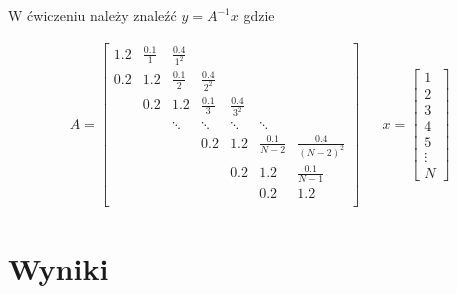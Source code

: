 \documentclass[11pt]{extarticle}
\begin{document}
	\subsection{}
	W ćwiczeniu należy znaleźć \(y = A^{-1}x\) gdzie

	\begin{align}
		A = \begin{bmatrix}
							  1.2		& \frac{0.1}{1}		& \frac{0.4}{1^2} 		\\[6pt]
					0.2		& 1.2		& \frac{0.1}{2}		& \frac{0.4}{2^2} 		\\[6pt]
			&		0.2		& 1.2		& \frac{0.1}{3}		& \frac{0.4}{3^2} 		\\[6pt]
			&&		\ddots	& \ddots	& \ddots			& \ddots 				\\[6pt]
			&&&		0.2		& 1.2		& \frac{0.1}{N-2}	& \frac{0.4}{(N-2)^2} 	\\[6pt]
			&&&&	0.2		& 1.2		& \frac{0.1}{N-1}							\\[6pt]
			&&&&&	0.2		& 1.2													\\
		\end{bmatrix} &&
		x = \begin{bmatrix}
			1 \\[6pt]
			2 \\[6pt]
			3 \\[6pt]
			4 \\[6pt]
			5 \\[6pt]
			\vdots \\[6pt]
			N
		\end{bmatrix}
	\end{align}

	\section{Wyniki}
	
\end{document}
